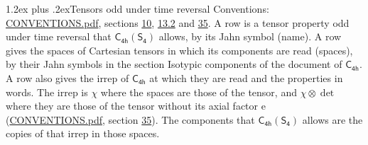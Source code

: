 \documentclass[10pt,a4paper]{article}
\makeatletter
\renewcommand\section{\@startsection{section}{1}{\z@}{-3ex plus -1ex minus -.2ex}%
  {1.2ex plus .2ex}{\normalfont\large\sffamily\bfseries\color{parttitle}}}
\numberwithin{equation}{section}
\newcommand{\grp}[1]{\mathsf{#1}}
\newcommand{\irrprod}{\otimes}
\makeatother
\begin{document}
\section{Tensors odd under time reversal}\label{s:time_odd}
Conventions: \href{../../CONVENTIONS.pdf}{CONVENTIONS.pdf}, sections \href{../../../rotation/CONVENTIONS.pdf\#conv.10}{10}, \href{../../../rotation/CONVENTIONS.pdf\#conv.13.2}{13.2} and \href{../../CONVENTIONS.pdf\#conv.35}{35}.
\leavevmode\label{n:head.name.property}A row is a tensor property odd under time reversal that $\grp{C_{4h}}(\grp{S_{4}})$ allows, by its Jahn symbol (name). \label{n:head.spaces}A row gives the spaces of Cartesian tensors in which its components are read (spaces), by their Jahn symbols in the section Isotypic components of the document of \href{../../../rotation/data/pdf/C4h.pdf}{$\grp{C_{4h}}$}. \label{n:head.properties}A row also gives the irrep of $\grp{C_{4h}}$ at which they are read and the properties in words. The irrep is $\chi$ where the spaces are those of the tensor, and $\chi \irrprod \det$ where they are those of the tensor without its axial factor e (\href{../../CONVENTIONS.pdf}{CONVENTIONS.pdf}, section \href{../../CONVENTIONS.pdf\#conv.35}{35}). The components that $\grp{C_{4h}}(\grp{S_{4}})$ allows are the copies of that irrep in those spaces.
\end{document}
